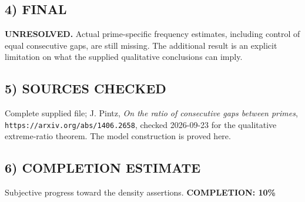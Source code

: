 \subsection*{4) FINAL}
\textbf{UNRESOLVED.} Actual prime-specific frequency estimates, including control of equal consecutive gaps, are still missing. The additional result is an explicit limitation on what the supplied qualitative conclusions can imply.
\subsection*{5) SOURCES CHECKED}
Complete supplied file; J. Pintz, \emph{On the ratio of consecutive gaps between primes}, \texttt{https://arxiv.org/abs/1406.2658}, checked 2026-09-23 for the qualitative extreme-ratio theorem. The model construction is proved here.
\subsection*{6) COMPLETION ESTIMATE}
Subjective progress toward the density assertions.
\textbf{COMPLETION: 10\%}
